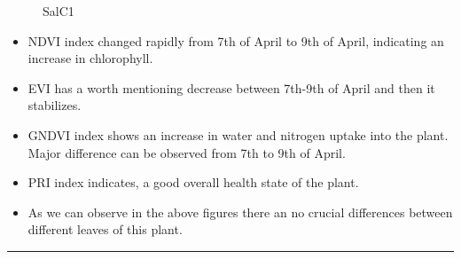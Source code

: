 \documentclass{article}
\begin{document}
{\begin{landscape}
\begin{figure}[h]
\begin{subfigure}[b]{0.72\textwidth}
                      \end{subfigure}
                      \caption{SalC1}
                      \label{fig:example}
                    \end{figure}
                    \vspace*{2\baselineskip}
                    
                    \begin{itemize}
                       \item NDVI index changed rapidly from 7th of April to 9th of April, indicating an increase in chlorophyll.
                       \item EVI has a worth mentioning decrease between 7th-9th of April and then it stabilizes.
                       \item GNDVI index shows an increase in water and nitrogen uptake into the plant. Major difference can be observed from 7th to 9th of April.
                       \item PRI index indicates, a good overall health state of the plant.
                       \item As we can observe in the above figures there an no crucial differences between different leaves of this plant.
                    \end{itemize}
                    \newpage
                    \vspace*{-3.8\baselineskip}
                    \hrule
                    \vspace*{3\baselineskip}
                    

\end{landscape}}
\end{document}
